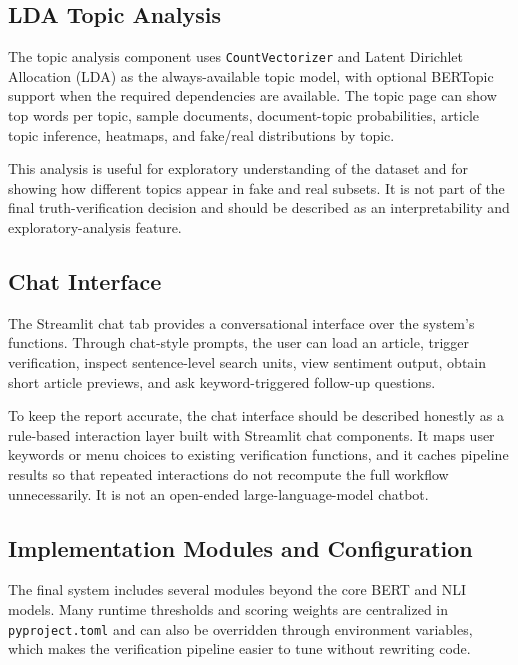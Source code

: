 \documentclass[11pt]{article}
\newcommand{\code}[1]{\texttt{#1}}
\begin{document}
\subsection{LDA Topic Analysis}

The topic analysis component uses \code{CountVectorizer} and Latent Dirichlet
Allocation (LDA) as the always-available topic model, with optional BERTopic
support when the required dependencies are available. The topic page can show
top words per topic, sample documents, document-topic probabilities, article
topic inference, heatmaps, and fake/real distributions by topic.

This analysis is useful for exploratory understanding of the dataset and for
showing how different topics appear in fake and real subsets. It is not part of
the final truth-verification decision and should be described as an
interpretability and exploratory-analysis feature.

\subsection{Chat Interface}

The Streamlit chat tab provides a conversational interface over the system's
functions. Through chat-style prompts, the user can load an article, trigger
verification, inspect sentence-level search units, view sentiment output,
obtain short article previews, and ask keyword-triggered follow-up questions.

To keep the report accurate, the chat interface should be described honestly as
a rule-based interaction layer built with Streamlit chat components. It maps
user keywords or menu choices to existing verification functions, and it caches
pipeline results so that repeated interactions do not recompute the full
workflow unnecessarily. It is not an open-ended large-language-model chatbot.

\subsection{Implementation Modules and Configuration}

The final system includes several modules beyond the core BERT and NLI models.
Many runtime thresholds and scoring weights are centralized in
\code{pyproject.toml} and can also be overridden through environment variables,
which makes the verification pipeline easier to tune without rewriting code.
\end{document}
